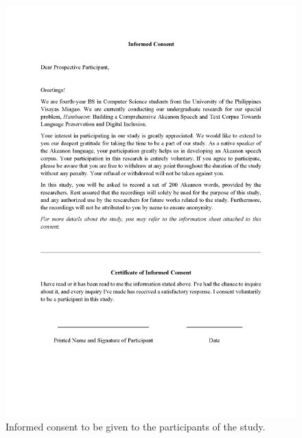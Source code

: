 \begin{figure}[h!]
    \centering
    \includegraphics[width=\textwidth]{./appendix/letters_Page_1.png}
    \caption{Informed consent to be given to the participants of the study.}
    \label{fig:informedConsent}
\end{figure}

